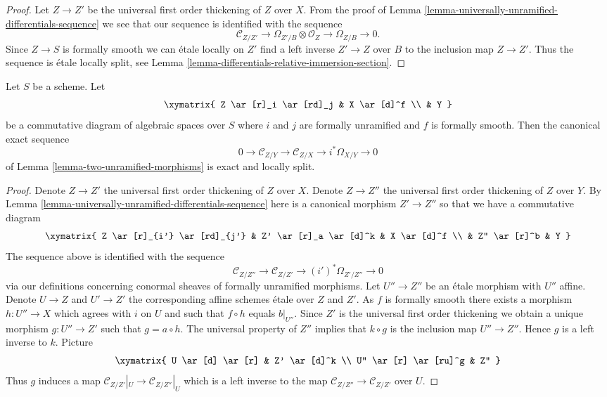 \begin{proof}
Let $Z \to Z'$ be the universal first order thickening of $Z$ over $X$.
From the proof of
Lemma \ref{lemma-universally-unramified-differentials-sequence}
we see that our sequence is identified with the sequence
$$
\mathcal{C}_{Z/Z'} \to \Omega_{Z'/B} \otimes \mathcal{O}_Z \to
\Omega_{Z/B} \to 0.
$$
Since $Z \to S$ is formally smooth we can \'etale locally on $Z'$ find
a left inverse $Z' \to Z$ over $B$ to the inclusion map $Z \to Z'$.
Thus the sequence is \'etale locally split, see
Lemma \ref{lemma-differentials-relative-immersion-section}.
\end{proof}

\begin{lemma}
\label{lemma-two-unramified-morphisms-formally-smooth}
Let $S$ be a scheme. Let
$$
\xymatrix{
Z \ar[r]_i \ar[rd]_j & X \ar[d]^f \\
& Y
}
$$
be a commutative diagram of algebraic spaces over $S$
where $i$ and $j$ are formally unramified and $f$ is formally smooth.
Then the canonical exact sequence
$$
0 \to
\mathcal{C}_{Z/Y} \to
\mathcal{C}_{Z/X} \to
i^*\Omega_{X/Y} \to 0
$$
of
Lemma \ref{lemma-two-unramified-morphisms}
is exact and locally split.
\end{lemma}

\begin{proof}
Denote $Z \to Z'$ the universal first order thickening of $Z$ over $X$.
Denote $Z \to Z''$ the universal first order thickening of $Z$ over $Y$.
By
Lemma \ref{lemma-universally-unramified-differentials-sequence}
here is a canonical morphism $Z' \to Z''$ so that we have a commutative
diagram
$$
\xymatrix{
Z \ar[r]_{i'} \ar[rd]_{j'} & Z' \ar[r]_a \ar[d]^k & X \ar[d]^f \\
& Z'' \ar[r]^b & Y
}
$$
The sequence above is identified with the sequence
$$
\mathcal{C}_{Z/Z''} \to
\mathcal{C}_{Z/Z'} \to
(i')^*\Omega_{Z'/Z''} \to 0
$$
via our definitions concerning conormal sheaves of formally unramified
morphisms. Let $U'' \to Z''$ be an \'etale morphism with $U''$ affine.
Denote $U \to Z$ and $U' \to Z'$ the corresponding affine
schemes \'etale over $Z$ and $Z'$.
As $f$ is formally smooth there exists a morphism $h : U'' \to X$
which agrees with $i$ on $U$ and such that $f \circ h$ equals $b|_{U''}$.
Since $Z'$ is the universal first order thickening we obtain a unique
morphism $g : U'' \to Z'$ such that $g = a \circ h$. The universal
property of $Z''$ implies that $k \circ g$ is the inclusion map
$U'' \to Z''$. Hence $g$ is a left inverse to $k$. Picture
$$
\xymatrix{
U \ar[d] \ar[r] & Z' \ar[d]^k \\
U'' \ar[r] \ar[ru]^g & Z''
}
$$
Thus $g$ induces a map $\mathcal{C}_{Z/Z'}|_U \to \mathcal{C}_{Z/Z''}|_U$
which is a left inverse to the map
$\mathcal{C}_{Z/Z''} \to \mathcal{C}_{Z/Z'}$ over $U$.
\end{proof}











